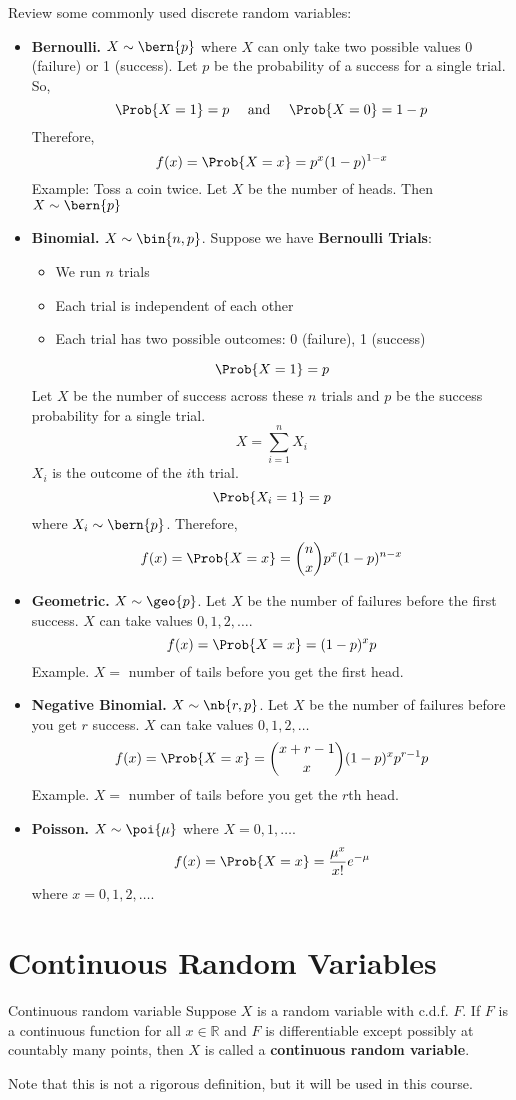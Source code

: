 Review some commonly used discrete random variables:
\begin{itemize}
    \item \textbf{Bernoulli.} $ X \sim \bern{p} $
          where $ X $ can only take two possible values 0 (failure) or 1 (success).
          Let $ p $ be the probability of a success for a single trial. So,
          \[ \Prob{X=1}=p\quad\text{ and }\quad \Prob{X=0}=1-p \]
          Therefore,
          \[ f(x)=\Prob{X=x}=p^x(1-p)^{1-x} \]
          Example: Toss a coin twice. Let $ X $ be the number of heads.
          Then $ X \sim \bern{p} $
    \item \textbf{Binomial.} $ X \sim \bin{n,p} $. Suppose
          we have \textbf{Bernoulli Trials}:
          \begin{itemize}
              \item We run $ n $ trials
              \item Each trial is independent of each other
              \item Each trial has two possible outcomes: 0 (failure), 1 (success)
          \end{itemize}
          \[ \Prob{X=1}=p \]
          Let $ X $ be the number of success across these $ n $ trials
          and $ p $ be the success probability for a single trial.
          \[ X=\sum\limits_{i=1}^{n} X_i \]
          $ X_i $ is the outcome of the $ i $th trial.
          \[ \Prob{X_i=1}=p \]
          where $ X_i \sim \bern{p} $. Therefore,
          \[ f(x)=\Prob{X=x}=\binom{n}{x}p^x(1-p)^{n-x} \]
    \item \textbf{Geometric.} $ X \sim \geo{p} $.
          Let $ X $ be the number of failures before the first success.
          $ X $ can take values $ 0,1,2,\ldots $.
          \[ f(x)=\Prob{X=x}=(1-p)^x p \]
          Example. $ X = $ number of tails before you get the first
          head.
    \item \textbf{Negative Binomial.} $ X \sim \nb{r,p} $.
          Let $ X $ be the number of failures before you get $ r $ success.
          $ X $ can take values $ 0,1,2,\ldots $
          \[ f(x)=\Prob{X=x}=\binom{x+r-1}{x}(1-p)^x p^{r-1}p \]
          Example. $ X= $ number of tails before you get the $ r $th head.
    \item \textbf{Poisson.} $ X \sim \poi{\mu} $
          where $ X = 0,1,\ldots $.
          \[ f(x)=\Prob{X=x}=\frac{\mu^x}{x!} e^{-\mu} \]
          where $ x=0,1,2,\ldots $.
\end{itemize}

\section{Continuous Random Variables}
\begin{Definition}{Continuous random variable}{}
    Suppose $ X $ is a random variable with c.d.f. $ F $. If $ F $
    is a continuous function for all $ x\in\mathbb{R} $ and
    $ F $ is differentiable except possibly at
    countably many points, then $ X $ is called a
    \textbf{continuous random variable}.
\end{Definition}
Note that this is not a rigorous definition, but it will be
used in this course.

